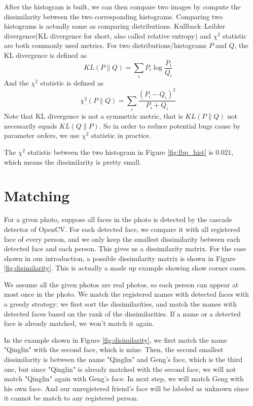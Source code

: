 \documentclass[paper=a4, fontsize=11pt]{scrartcl} %
\numberwithin{equation}{section} %
\numberwithin{figure}{section} %
\numberwithin{table}{section} %
\begin{document}
After the histogram is built, we can then compare two images by compute the dissimilarity between the two corresponding histograms. Comparing two histograms is actually same as comparing distributions. Kullback--Leibler divergence(KL divergence for short, also called relative entropy) and $\chi^2$ statistic are both commonly used metrics. For two distributions/histograms $P$ and $Q$, the KL divergence is defined as
$$KL(P\|Q)=\sum_{i}P_i\log\frac{P_i}{Q_i}$$
And the $\chi^2$ statistic is defined as
$$\chi^2(P\|Q)=\sum_{i}\frac{(P_i - Q_i)^2}{P_i + Q_i}$$
Note that KL divergence is not a symmetric metric, that is $KL(P\|Q)$ not necessarily equals $KL(Q\|P)$. So in order to reduce potential bugs cause by parameter orders, we use $\chi^2$ statistic in practice. 

The $\chi^2$ statistic between the two histogram in Figure \ref{fig:lbp_hist} is $0.021$, which means the dissimilarity is pretty small.

\section{Matching}

For a given photo, suppose all faces in the photo is detected by the cascade detector of OpenCV. For each detected face, we compare it with all registered face of every person, and we only keep the smallest dissimilarity between each detected face and each person. This gives us a dissimilarity matrix. For the case shown in our introduction, a possible dissimilarity matrix is shown in Figure \ref{fig:disimilarity}. This is actually a made up example showing show corner cases.

We assume all the given photos are real photos, so each person can appear at most once in the photo. We match the registered names with detected faces with a greedy strategy: we first sort the dissimilarities, and match the names with detected faces based on the rank of the dissimilarities. If a name or a detected face is already matched, we won't match it again.

In the example shown in Figure \ref{fig:disimilarity}, we first match the name "Qinglin" with the second face, which is mine. Then, the second smallest dissimilarity is between the name "Qinglin" and Geng's face, which is the third one, but since "Qinglin" is already matched with the second face, we will not match "Qinglin" again with Geng's face. In next step, we will match Geng with his own face. And our unregistered friend's face will be labeled as unknown since it cannot be match to any registered person.
\end{document}

